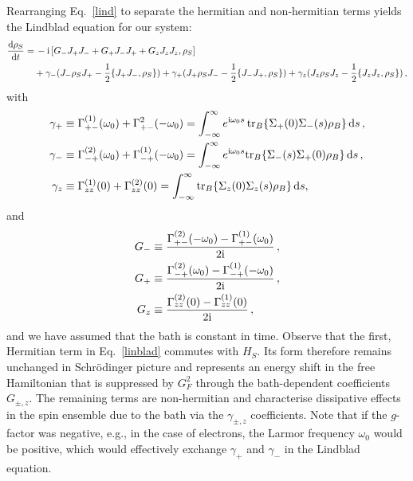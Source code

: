 \documentclass[aps,prd,10pt,twocolumn,superscriptaddress,floatfix,nofootinbib,amsmath,amssymb,altaffilletter,preprintnumbers]{revtex4-1}
\begin{document}
Rearranging Eq.~\eqref{lind} to separate the hermitian and non-hermitian terms yields the Lindblad equation for our system:
\begin{equation}
\begin{aligned}
\frac{\mathrm{d} \rho_S}{\mathrm{d}t} = & \, 
-{\rm i}\, [G_{-}J_+J_-+G_{+}J_-J_++G_{z}J_zJ_z,\rho_S] \\
& + \gamma_{-}(J_- \rho_S J_+ - \frac{1}{2} \{J_+ J_-,\rho_S\} )  + \gamma_{+}(J_+ \rho_S J_- - \frac{1}{2} \{J_- J_+,\rho_S\} )
 + \gamma_{z}(J_z \rho_S J_z - \frac{1}{2} \{J_z J_z,\rho_S\} ) \, ,
\label{linblad}
\end{aligned}
\end{equation}
with
\begin{equation}
\begin{aligned}
\gamma_{+} \equiv & \; \Gamma_{+-}^{(1)}(\omega_0)+\Gamma_{+-}^2(-\omega_0)=\int_{-\infty}^{\infty}e^{{\rm i}\omega_0 s}\, \text{tr}_B\{\Sigma_+(0)\Sigma_-(s)\rho_B\}\, {\rm d}s\, , \\
\gamma_{-} \equiv  &\; \Gamma_{-+}^{(2)}(\omega_0)+\Gamma_{-+}^{(1)}(-\omega_0)=\int_{-\infty}^{\infty}e^{{\rm i}\omega_0 s}\text{tr}_B\{\Sigma_-(s)\Sigma_+(0)\rho_B\}\, {\rm d}s\, , \\
\gamma_{z}\equiv &\; \Gamma_{zz}^{(1)}(0)+\Gamma_{zz}^{(2)}(0)=\int_{-\infty}^{\infty}\text{tr}_B\{\Sigma_z(0)\Sigma_z(s)\rho_B\}\, {\rm d}s,\,
\label{eq:gammas}
\end{aligned}
\end{equation}
and
\begin{equation}
\begin{aligned}
G_{-}\equiv &\; \frac{\Gamma_{+-}^{(2)}(-\omega_0)-\Gamma_{+-}^{(1)}(\omega_0)}{2{\rm i}}\, , \\
G_{+} \equiv &\; \frac{\Gamma_{-+}^{(2)}(\omega_0)-\Gamma_{-+}^{(1)}(-\omega_0)}{2{\rm i}}\, ,\\
G_{z} \equiv &\; \frac{\Gamma_{zz}^{(2)}(0)-\Gamma_{zz}^{(1)}(0)}{2{\rm i}}\,,
\end{aligned}
\end{equation}
and we have assumed that the bath is constant in time.  Observe that the first, Hermitian term in Eq.~\eqref{linblad} commutes with $H_S$. Its form therefore remains unchanged in Schr\"{o}dinger picture and represents an energy shift in the free Hamiltonian that is suppressed by $G_F^2$ through the bath-dependent coefficients $G_{\pm,z}$. The remaining terms are non-hermitian and characterise dissipative effects in the spin ensemble due to the bath via the $\gamma_{\pm,z}$ coefficients.
Note that if the $g$-factor was negative, e.g., in the case of electrons, the Larmor frequency $\omega_0$ would be positive, which would effectively exchange $\gamma_{+}$ and $\gamma_{-}$ in the Lindblad equation.
\end{document}
